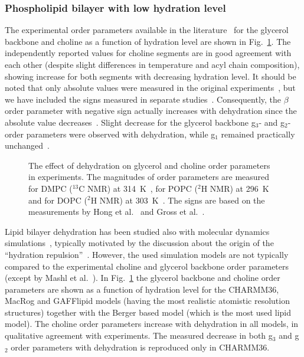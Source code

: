\documentclass[pre,aps,floatfix,authordate1-4,twocolumn]{revtex4-1}
\begin{document}
\subsubsection{Phospholipid bilayer with low hydration level}
The experimental order parameters available in the literature~\cite{dvinskikh05b,ulrich94,bechinger91} 
for the glycerol backbone and choline as a function of hydration level are shown in Fig.~\ref{ordPhydr}. 
The independently reported values for choline segments are in good agreement with each other (despite 
slight differences in temperature and acyl chain composition),
showing increase for both segments with decreasing hydration level. It should be noted that only 
absolute values were measured in the original experiments~\cite{dvinskikh05b,ulrich94,bechinger91}, but
we have included the signs measured in separate studies~\cite{hong95a,hong95b,gross97}. 
Consequently, the $\beta$ order parameter with negative sign actually increases with dehydration 
since the absolute value decreases~\cite{dvinskikh05b,ulrich94,bechinger91}.
Slight decrease for the glycerol backbone g$_3$- and g$_2$- order parameters were observed with dehydration, 
while g$_1$ remained practically unchanged~\cite{dvinskikh05b}.
\begin{figure}[]
  \centering
  \caption{\label{ordPhydr}
    The effect of dehydration on glycerol and choline order parameters in experiments.
    The magnitudes of order parameters are measured for DMPC ($^{13}$C NMR) at 314~K~\cite{dvinskikh05b}, 
    for POPC ($^2$H NMR) at 296~K~\cite{bechinger91} and for DOPC ($^2$H NMR) at 303~K~\cite{ulrich94}. 
    The signs are based on the measurements by Hong et al.~\cite{hong95a,hong95b} 
    and Gross et al.~\cite{gross97}.
  }
\end{figure}

Lipid bilayer dehydration has been studied also with molecular dynamics simulations~\cite{mashl01,pertsin05,pertsin07,eun09,eun10,schneck12},
typically motivated by the  discussion about the origin of the ``hydration repulsion''~\cite{israelachvili,israelachvili96,sparr11}.
However, the used simulation models are not typically compared to the experimental choline and glycerol backbone
order parameters (except by Mashl et al.~\cite{mashl01}).
In Fig.~\ref{ordPhydr} the glycerol backbone and choline order parameters are shown as a function of hydration level for the CHARMM36, MacRog and GAFFlipid models (having the most realistic atomistic resolution structures) together with the Berger based model 
(which is the most used lipid model). The choline order parameters increase with dehydration in all
models, in qualitative agreement with experiments. 
The measured decrease in both g$_3$ and g$_2$ order parameters with dehydration is reproduced only in CHARMM36.
\end{document}
